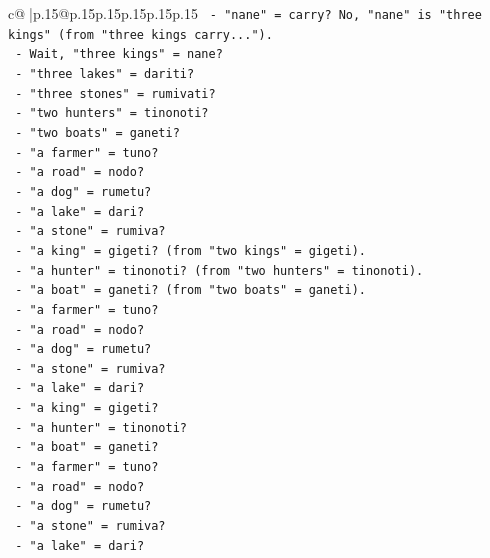 \documentclass{article}
\begin{document}
{\begin{supertabular}{c@{$\;$}|p{.15\linewidth}@{}p{.15\linewidth}p{.15\linewidth}p{.15\linewidth}p{.15\linewidth}p{.15\linewidth}}
{{{\texttt{                {-} "nane" = carry? No, "nane" is "three kings" (from "three kings carry...").} \\
\texttt{                {-} Wait, "three kings" = nane?} \\
\texttt{                {-} "three lakes" = dariti?} \\
\texttt{                {-} "three stones" = rumivati?} \\
\texttt{                {-} "two hunters" = tinonoti?} \\
\texttt{                {-} "two boats" = ganeti?} \\
\texttt{                {-} "a farmer" = tuno?} \\
\texttt{                {-} "a road" = nodo?} \\
\texttt{                {-} "a dog" = rumetu?} \\
\texttt{                {-} "a lake" = dari?} \\
\texttt{                {-} "a stone" = rumiva?} \\
\texttt{                {-} "a king" = gigeti? (from "two kings" = gigeti).} \\
\texttt{                {-} "a hunter" = tinonoti? (from "two hunters" = tinonoti).} \\
\texttt{                {-} "a boat" = ganeti? (from "two boats" = ganeti).} \\
\texttt{                {-} "a farmer" = tuno?} \\
\texttt{                {-} "a road" = nodo?} \\
\texttt{                {-} "a dog" = rumetu?} \\
\texttt{                {-} "a stone" = rumiva?} \\
\texttt{                {-} "a lake" = dari?} \\
\texttt{                {-} "a king" = gigeti?} \\
\texttt{                {-} "a hunter" = tinonoti?} \\
\texttt{                {-} "a boat" = ganeti?} \\
\texttt{                {-} "a farmer" = tuno?} \\
\texttt{                {-} "a road" = nodo?} \\
\texttt{                {-} "a dog" = rumetu?} \\
\texttt{                {-} "a stone" = rumiva?} \\
\texttt{                {-} "a lake" = dari?} \\
}}}
\end{supertabular}}
\end{document}
